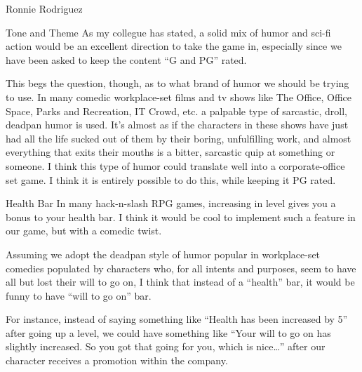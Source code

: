 \documentclass[12pt]{report}
\begin{document}
\begin{section}{Ronnie Rodriguez}
\begin{subsection}{Tone and Theme}
As my collegue has stated, a solid mix of humor and sci-fi action would be
an excellent direction to take the game in, especially since we have been
asked to keep the content ``G and PG'' rated. 

This begs the question, though, as to what brand of humor we should be
trying to use. In many comedic workplace-set films and tv shows like The
Office, Office Space, Parks and Recreation, IT Crowd, etc. a palpable type
of sarcastic, droll, deadpan humor is used. It's almost as if the
characters in these shows have just had all the life sucked out of them by
their boring, unfulfilling work, and almost everything that exits their
mouths is a bitter, sarcastic quip at something or someone. I think this
type of humor could translate well into a corporate-office set game. I
think it is entirely possible to do this, while keeping it PG rated. 
\end{subsection}

\begin{subsection}{Health Bar}
In many hack-n-slash RPG games, increasing in level gives you a bonus to 
your health bar. I think it would be cool to implement such a feature in
our game, but with a comedic twist. 

Assuming we adopt the deadpan style of humor popular in workplace-set
comedies populated by characters who, for all intents and purposes, seem to
have all but lost their will to go on, I think that instead of a ``health''
bar, it would be funny to have ``will to go on'' bar. 

For instance, instead of saying something like ``Health has been increased
by 5'' after going up a level, we could have something like ``Your will to
go on has slightly increased. So you got that going for you, which is
nice\ldots'' after our character receives a promotion within the company.
\end{subsection}
\end{section}
\end{document}
